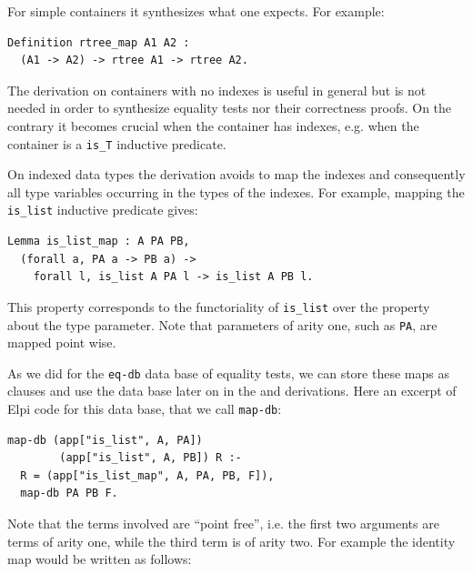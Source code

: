 \documentclass[sigplan,10pt,review]{acmart}\settopmatter{printfolios=true,printccs=false,printacmref=false}
\newcommand{\derive}[1]{\keys{#1}}
\begin{document}
For simple containers it synthesizes what one expects. For example:

\begin{minipage}{\textwidth}\begin{lstlisting}
Definition rtree_map A1 A2 :
  (A1 -> A2) -> rtree A1 -> rtree A2.
\end{lstlisting}\end{minipage}

The derivation on containers with no indexes is useful in general
but is not needed in order
to synthesize equality tests nor their correctness proofs.
On the contrary it becomes crucial when the container has indexes,
e.g. when the container is a \lstinline+is_T+ inductive predicate.

On indexed data types the derivation avoids to map the indexes and
consequently all type variables occurring in the types of the indexes.
For example, mapping the \lstinline+is_list+ inductive predicate gives:

\begin{minipage}{\textwidth}\begin{lstlisting}
Lemma is_list_map : A PA PB,
  (forall a, PA a -> PB a) ->
    forall l, is_list A PA l -> is_list A PB l.
\end{lstlisting}\end{minipage}

\noindent
This property corresponds to the functoriality of \lstinline+is_list+
over the property about the type parameter. Note that parameters of
arity one, such as \lstinline+PA+, are mapped point wise.

As we did for the \lstinline+eq-db+ data base of equality tests, we
can store these maps as clauses and use the data base later on in the
\derive{induction} and \derive{eqcorrect} derivations.
Here an excerpt of Elpi code for this data base, that we call
\lstinline+map-db+:

\begin{minipage}{\textwidth}\begin{lstlisting}[]
map-db (app["is_list", A, PA])
        (app["is_list", A, PB]) R :-
  R = (app["is_list_map", A, PA, PB, F]),
  map-db PA PB F.
\end{lstlisting}\end{minipage}

\noindent
Note that the terms involved are ``point free'', i.e.
the first two arguments are terms of arity one, while
the third term is of arity two. For example the identity
map would be written as follows:
\end{document}

